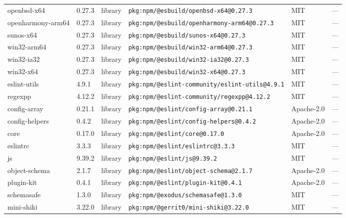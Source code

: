 \documentclass[11pt,a4paper]{article}
\begin{document}
\begin{longtable}{|p{4cm}|p{2cm}|p{1.6cm}|p{5cm}|p{1.5cm}|p{3.5cm}|}
\raggedright openbsd-x64 & 0.27.3 & library & \small\texttt{pkg:npm/@esbuild/openbsd-x64@0.27.3} & MIT & \small — \\
\raggedright openharmony-arm64 & 0.27.3 & library & \small\texttt{pkg:npm/@esbuild/openharmony-arm64@0.27.3} & MIT & \small — \\
\raggedright sunos-x64 & 0.27.3 & library & \small\texttt{pkg:npm/@esbuild/sunos-x64@0.27.3} & MIT & \small — \\
\raggedright win32-arm64 & 0.27.3 & library & \small\texttt{pkg:npm/@esbuild/win32-arm64@0.27.3} & MIT & \small — \\
\raggedright win32-ia32 & 0.27.3 & library & \small\texttt{pkg:npm/@esbuild/win32-ia32@0.27.3} & MIT & \small — \\
\raggedright win32-x64 & 0.27.3 & library & \small\texttt{pkg:npm/@esbuild/win32-x64@0.27.3} & MIT & \small — \\
\raggedright eslint-utils & 4.9.1 & library & \small\texttt{pkg:npm/@eslint-community/eslint-utils@4.9.1} & MIT & \small — \\
\raggedright regexpp & 4.12.2 & library & \small\texttt{pkg:npm/@eslint-community/regexpp@4.12.2} & MIT & \small — \\
\raggedright config-array & 0.21.1 & library & \small\texttt{pkg:npm/@eslint/config-array@0.21.1} & Apache-2.0 & \small — \\
\raggedright config-helpers & 0.4.2 & library & \small\texttt{pkg:npm/@eslint/config-helpers@0.4.2} & Apache-2.0 & \small — \\
\raggedright core & 0.17.0 & library & \small\texttt{pkg:npm/@eslint/core@0.17.0} & Apache-2.0 & \small — \\
\raggedright eslintrc & 3.3.3 & library & \small\texttt{pkg:npm/@eslint/eslintrc@3.3.3} & MIT & \small — \\
\raggedright js & 9.39.2 & library & \small\texttt{pkg:npm/@eslint/js@9.39.2} & MIT & \small — \\
\raggedright object-schema & 2.1.7 & library & \small\texttt{pkg:npm/@eslint/object-schema@2.1.7} & Apache-2.0 & \small — \\
\raggedright plugin-kit & 0.4.1 & library & \small\texttt{pkg:npm/@eslint/plugin-kit@0.4.1} & Apache-2.0 & \small — \\
\raggedright schemasafe & 1.3.0 & library & \small\texttt{pkg:npm/@exodus/schemasafe@1.3.0} & MIT & \small — \\
\raggedright mini-shiki & 3.22.0 & library & \small\texttt{pkg:npm/@gerrit0/mini-shiki@3.22.0} & MIT & \small — \\

\end{longtable}
\end{document}
